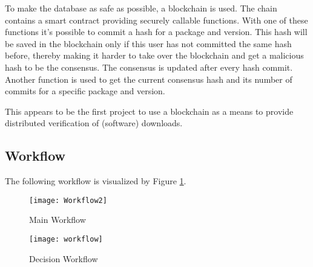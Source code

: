 To make the database as safe as possible, a blockchain is used. The chain contains a smart contract providing securely callable functions. With one of these functions it's possible to commit a hash for a package and version. This hash will be saved in the blockchain only if this user has not committed the same hash before, thereby making it harder to take over the blockchain and get a malicious hash to be the consensus. The consensus is updated after every hash commit. Another function is used to get the current consensus hash and its number of commits for a specific package and version.

This appears to be the first project to use a blockchain as a means to provide distributed verification of (software) downloads.

\subsection*{Workflow}
The following workflow is visualized by Figure \ref{fig:main_workflow}.
\begin{figure}
	\centering
		\texttt{[image: Workflow2]}
	\caption{Main Workflow}
	\label{fig:main_workflow}
\end{figure}

\begin{figure}
	\centering
		\texttt{[image: workflow]}
	\caption{Decision Workflow}
	\label{fig:decision_workflow}
\end{figure}


